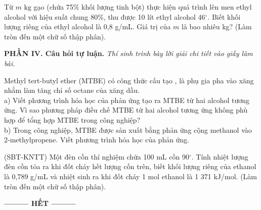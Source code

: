 \documentclass[12pt,a4paper]{article}
\begin{document}
\begin{ex}
Từ $m\text{ kg}$ gạo (chứa 75\% khối lượng tinh bột) thực hiện quá trình lên men ethyl alcohol với hiệu suất chung 80\%, thu được 10 lít ethyl alcohol 46$^\circ$. Biết khối lượng riêng của ethyl alcohol là 0,8 g/mL. Giá trị của $m$ là bao nhiêu kg? (Làm tròn đến một chữ số thập phân).
\end{ex}

\bigskip
\noindent\textbf{\large PHẦN IV. Câu hỏi tự luận.}
\textit{Thí sinh trình bày lời giải chi tiết vào giấy làm bài.}
\vspace{0.2cm}

\begin{ex}
Methyl tert-butyl ether (MTBE) có công thức cấu tạo , là phụ gia pha vào xăng nhằm làm tăng chỉ số octane của xăng dầu.\\
a) Viết phương trình hóa học của phản ứng tạo ra MTBE từ hai alcohol tương ứng. Vì sao phương pháp điều chế MTBE từ hai alcohol tương ứng không phù hợp để tổng hợp MTBE trong công nghiệp?\\
b) Trong công nghiệp, MTBE được sản xuất bằng phản ứng cộng methanol vào 2-methylpropene. Viết phương trình hóa học của phản ứng.

\vspace{4.0cm}

\end{ex}

\begin{ex}
(SBT-KNTT) Một đèn cồn thí nghiệm chứa 100 mL cồn 90$^\circ$. Tính nhiệt lượng đèn cồn tỏa ra khi đốt cháy hết lượng cồn trên, biết khối lượng riêng của ethanol là 0,789 g/mL và nhiệt sinh ra khi đốt cháy 1 mol ethanol là 1 371 kJ/mol. (Làm tròn đến một chữ số thập phân).

\vspace{4.0cm}

\end{ex}

\begin{center}
\textbf{--------- HẾT ---------}
\end{center}
\end{document}
